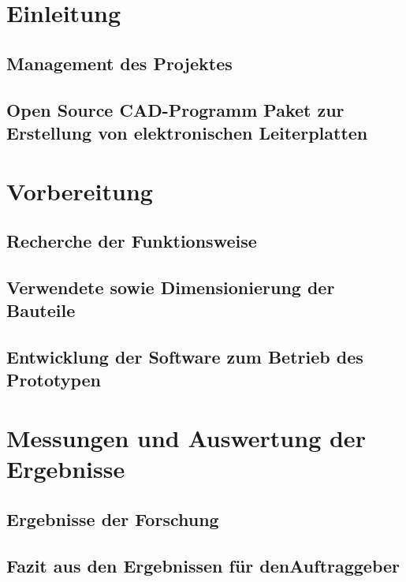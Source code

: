 \documentclass [11pt,a4paper,bibliography=totoc]{scrreprt}%
\begin{document}
\thispagestyle{empty}

\newpage
\thispagestyle{empty}

\setcounter{page}{0}
\newpage 
{} 
\tableofcontents 
\newpage
\newpage
\setcounter{page}{0}

\chapter{Einleitung}

\section{Management des Projektes}

\section{Open Source CAD-Programm Paket zur Erstellung von elektronischen Leiterplatten}



\chapter{Vorbereitung}
\section{Recherche der Funktionsweise}

\section{Verwendete sowie Dimensionierung der Bauteile}

\section{Entwicklung der Software zum Betrieb des Prototypen}


\chapter{Messungen und Auswertung der Ergebnisse}
%
\section{Ergebnisse der Forschung}
%
\section{Fazit aus den Ergebnissen für denAuftraggeber}
%
\end{document}
